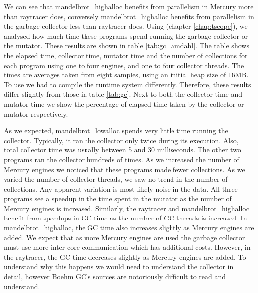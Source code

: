 

We can see that mandelbrot\_highalloc benefits from parallelism in Mercury
more than raytracer does,
conversely mandelbrot\_highalloc benefits from parallelism in the garbage
collector less than raytracer does.
Using \tscope (chapter \ref{chap:tscope}),
we analysed how much time these programs spend running the garbage collector
or the mutator.
These results are shown in table \ref{tab:gc_amdahl}.
The table shows the elapsed time, collector time, mutator time and the
number of collections for each program using one to four engines, and one
to four collector threads.
The times are averages taken from eight samples,
using an initial heap size of 16MB.
To use \tscope we had to compile the runtime system differently.
Therefore,
these results differ slightly from those in table \ref{tab:gc}.
Next to both the collector time and mutator time
we show the percentage of elapsed time taken by the collector or mutator
respectively.

As we expected, mandelbrot\_lowalloc spends very little time running the collector.
Typically, it ran the collector only twice during its execution.
Also, total collector time was usually between 5 and 30 milliseconds.
The other two programs ran the collector hundreds of times.
As we increased the number of Mercury engines
we noticed that these programs made fewer collections.
As we varied the number of collector threads,
we saw no trend in the number of collections.
Any apparent variation is most likely noise in the data.
All three programs see a speedup in the time spent in the mutator as the
number of Mercury engines is increased.
Similarly,
the raytracer and mandelbrot\_highalloc benefit from speedups
in GC time as the number of GC threads is increased.
In mandelbrot\_highalloc,
the GC time also increases slightly as Mercury engines are added.
We expect that as more Mercury engines are used the garbage collector
must use more inter-core communication which has additional costs.
However, in the raytracer,
the GC time decreases slightly as Mercury engines are added.
To understand why this happens we would need to understand the collector in
detail,
however Boehm GC's sources are notoriously difficult to read and
understand.

